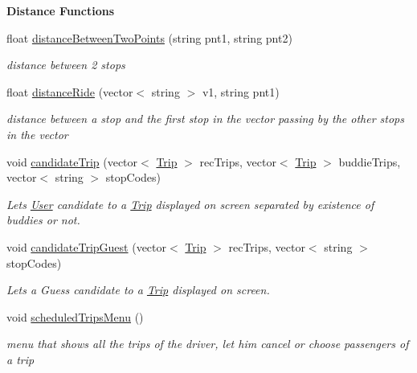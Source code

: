 \begin{Indent}\textbf{ Distance Functions}\par
\begin{DoxyCompactItemize}
\item 
float \hyperlink{group___agency_ga4efd6041c1293f0366b76356c05e3520}{distance\+Between\+Two\+Points} (string pnt1, string pnt2)
\begin{DoxyCompactList}\small\item\em distance between 2 stops \end{DoxyCompactList}\item 
float \hyperlink{group___agency_ga4a3c0e75130deeba5f9fe8dc4cec0468}{distance\+Ride} (vector$<$ string $>$ v1, string pnt1)
\begin{DoxyCompactList}\small\item\em distance between a stop and the first stop in the vector passing by the other stops in the vector \end{DoxyCompactList}\item 
void \hyperlink{group___agency_ga51d72590b842d0df300cd39846353f00}{candidate\+Trip} (vector$<$ \hyperlink{class_trip}{Trip} $>$ rec\+Trips, vector$<$ \hyperlink{class_trip}{Trip} $>$ buddie\+Trips, vector$<$ string $>$ stop\+Codes)
\begin{DoxyCompactList}\small\item\em Lets \hyperlink{class_user}{User} candidate to a \hyperlink{class_trip}{Trip} displayed on screen separated by existence of buddies or not. \end{DoxyCompactList}\item 
void \hyperlink{group___agency_ga55ae3f0e58a987ab17bd7dd358add125}{candidate\+Trip\+Guest} (vector$<$ \hyperlink{class_trip}{Trip} $>$ rec\+Trips, vector$<$ string $>$ stop\+Codes)
\begin{DoxyCompactList}\small\item\em Lets a Guess candidate to a \hyperlink{class_trip}{Trip} displayed on screen. \end{DoxyCompactList}\item 
void \hyperlink{group___agency_ga83b9652dad153b729c19f3413620908a}{scheduled\+Trips\+Menu} ()
\begin{DoxyCompactList}\small\item\em menu that shows all the trips of the driver, let him cancel or choose passengers of a trip \end{DoxyCompactList}\end{DoxyCompactItemize}
\end{Indent}
